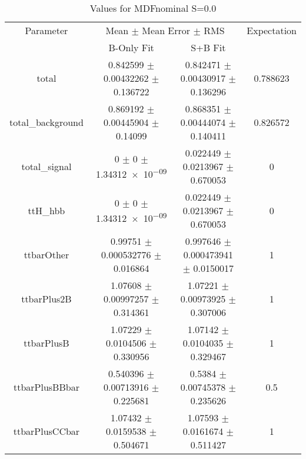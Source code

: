 \begin{table}
\centering
\caption{Values for MDFnominal S=0.0}
\begin{tabular}{cccc}
\toprule
Parameter & \multicolumn{2}{c}{Mean $\pm$ Mean Error $\pm$ RMS} & Expectation\\
 & B-Only Fit & S+B Fit & \\
\midrule
total & \num{0.842599} $\pm$ \num{0.00432262} $\pm$ \num{0.136722} & \num{0.842471} $\pm$ \num{0.00430917} $\pm$ \num{0.136296} & \num{0.788623}\\
total\_background & \num{0.869192} $\pm$ \num{0.00445904} $\pm$ \num{0.14099} & \num{0.868351} $\pm$ \num{0.00444074} $\pm$ \num{0.140411} & \num{0.826572}\\
total\_signal & \num{0} $\pm$ \num{0} $\pm$ \num{1.34312e-09} & \num{0.022449} $\pm$ \num{0.0213967} $\pm$ \num{0.670053} & \num{0}\\
ttH\_hbb & \num{0} $\pm$ \num{0} $\pm$ \num{1.34312e-09} & \num{0.022449} $\pm$ \num{0.0213967} $\pm$ \num{0.670053} & \num{0}\\
ttbarOther & \num{0.99751} $\pm$ \num{0.000532776} $\pm$ \num{0.016864} & \num{0.997646} $\pm$ \num{0.000473941} $\pm$ \num{0.0150017} & \num{1}\\
ttbarPlus2B & \num{1.07608} $\pm$ \num{0.00997257} $\pm$ \num{0.314361} & \num{1.07221} $\pm$ \num{0.00973925} $\pm$ \num{0.307006} & \num{1}\\
ttbarPlusB & \num{1.07229} $\pm$ \num{0.0104506} $\pm$ \num{0.330956} & \num{1.07142} $\pm$ \num{0.0104035} $\pm$ \num{0.329467} & \num{1}\\
ttbarPlusBBbar & \num{0.540396} $\pm$ \num{0.00713916} $\pm$ \num{0.225681} & \num{0.5384} $\pm$ \num{0.00745378} $\pm$ \num{0.235626} & \num{0.5}\\
ttbarPlusCCbar & \num{1.07432} $\pm$ \num{0.0159538} $\pm$ \num{0.504671} & \num{1.07593} $\pm$ \num{0.0161674} $\pm$ \num{0.511427} & \num{1}\\
\bottomrule
\end{tabular}
\end{table}